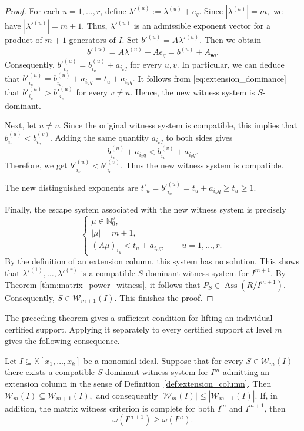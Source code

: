 \documentclass[11pt]{amsart}   %
\begin{document}
\begin{proof}
For each $u=1,\ldots,r$, define  $\lambda'^{(u)}:=\lambda^{(u)}+e_q.$ Since
 $|\lambda^{(u)}|=m,$ we have  $|\lambda'^{(u)}|=m+1.$ Thus,
  $\lambda'^{(u)}$ is an admissible exponent vector for a product of $m+1$ generators of $I$.
 Set $b'^{(u)}=A\lambda'^{(u)}.$  Then we obtain
\[
b'^{(u)}
=
A\lambda^{(u)}+Ae_q
=
b^{(u)}+A_{\bullet q}.
\]
Consequently,  $b'^{(u)}_{i_v}=b^{(u)}_{i_v}+a_{i_vq}$  for every $u,v$.  In particular,  we can deduce that
$b'^{(u)}_{i_u}
=
b^{(u)}_{i_u}+a_{i_uq}
=
t_u+a_{i_uq}.$  It follows from  \eqref{eq:extension_dominance} that
 $b'^{(u)}_{i_u}>b'^{(u)}_{i_v}$  for every $v\neq u.$ Hence,  the new witness system is $S$-dominant.

Next, let $u\neq v$.  Since the original witness system is compatible, this implies that
 $b^{(u)}_{i_v}<b^{(v)}_{i_v}.$  Adding the same quantity $a_{i_vq}$ to both sides gives
\[
b^{(u)}_{i_v}+a_{i_vq}
<
b^{(v)}_{i_v}+a_{i_vq}.
\]
Therefore, we get $b'^{(u)}_{i_v}<b'^{(v)}_{i_v}.$ Thus the new witness system is compatible.

The new distinguished exponents are $t'_u
=
b'^{(u)}_{i_u}
=
t_u+a_{i_uq}
\geq t_u
\geq1.
$

Finally, the escape system associated with the new witness system is
precisely
\[
\begin{cases}
\mu\in\mathbb N_0^s,\\
|\mu|=m+1,\\
(A\mu)_{i_u}<t_u+a_{i_uq},
\qquad u=1,\ldots,r.
\end{cases}
\]
By the definition of an extension column, this system has no solution.
This shows that  $\lambda'^{(1)},\ldots,\lambda'^{(r)}$ is a compatible $S$-dominant witness system for $I^{m+1}$.
By Theorem \ref{thm:matrix_power_witness}, it follows that  $P_S\in\operatorname{Ass}(R/I^{m+1}).$
Consequently,  $S\in\mathcal W_{m+1}(I).$ This finishes the proof.
\end{proof}


The preceding theorem gives a sufficient condition for lifting an
individual certified support.  Applying it separately to every
certified support at level $m$ gives the following consequence.

\begin{cor} \label{cor:omega_monotonicity}
Let $I\subseteq \mathbb K[x_1,\ldots,x_k]$ be a monomial ideal.  Suppose that for every
$S\in\mathcal W_m(I)$ there exists a compatible $S$-dominant witness system for $I^m$
admitting an extension column in the sense of Definition~\ref{def:extension_column}.  Then
 $\mathcal W_m(I)\subseteq\mathcal W_{m+1}(I),$ and consequently
 $|\mathcal W_m(I)| \leq |\mathcal W_{m+1}(I)|.$ If, in addition, the matrix witness criterion is complete for both
$I^m$ and $I^{m+1}$, then
$$\omega(I^{m+1})\geq\omega(I^m).$$
\end{cor}
\end{document}
